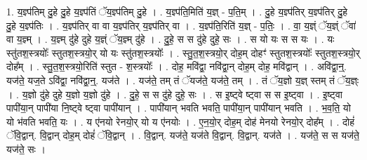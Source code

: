 \documentclass[17pt]{extarticle}
\begin{document}
1. य॒ज्ञ्प॑तिम् दु॒हे दु॒हे य॒ज्ञ्प॑तिं ॅय॒ज्ञ्प॑तिम् दु॒हे । . य॒ज्ञ्प॑ति॒मिति॑ य॒ज्ञ् - प॒ति॒म् । . दु॒हे य॒ज्ञ्प॑तिर् य॒ज्ञ्प॑तिर् दु॒हे दु॒हे य॒ज्ञ्प॑तिः । . य॒ज्ञ्प॑तिर् वा वा य॒ज्ञ्प॑तिर् य॒ज्ञ्प॑तिर् वा । . य॒ज्ञ्प॑ति॒रिति॑ य॒ज्ञ् - प॒तिः॒ । . वा॒ य॒ज्ञ्ं ॅय॒ज्ञ्ं ॅवा॑ वा य॒ज्ञ्म् । . य॒ज्ञ्म् दु॑हे दुहे य॒ज्ञ्ं ॅय॒ज्ञ्म् दु॑हे । . दु॒हे॒ स स दु॑हे दुहे॒ सः । . स यो यः स स यः । . यः स्तु॑तश॒स्त्रयोः᳚ स्तुतश॒स्त्रयो॒र् यो यः स्तु॑तश॒स्त्रयोः᳚ । . स्तु॒त॒श॒स्त्रयो॒र् दोह॒म् दोहꣳ॑ स्तुतश॒स्त्रयोः᳚ स्तुतश॒स्त्रयो॒र् दोह᳚म् । . स्तु॒त॒श॒स्त्रयो॒रिति॑ स्तुत - श॒स्त्रयोः᳚ । . दोह॒ मवि॑द्वा॒ नवि॑द्वा॒न् दोह॒म् दोह॒ मवि॑द्वान् । . अवि॑द्वा॒न्॒. यज॑ते॒ यज॒ते ऽवि॑द्वा॒ नवि॑द्वा॒न्॒. यज॑ते । . यज॑ते॒ तम् तं ॅयज॑ते॒ यज॑ते॒ तम् । . तं ॅय॒ज्ञो य॒ज्ञ् स्तम् तं ॅय॒ज्ञ्ः । . य॒ज्ञो दु॑हे दुहे य॒ज्ञो य॒ज्ञो दु॑हे । . दु॒हे॒ स स दु॑हे दुहे॒ सः । . स इ॒ष्ट्वे ष्ट्वा स स इ॒ष्ट्वा । . इ॒ष्ट्वा पापी॑या॒न् पापी॑या नि॒ष्ट्वे ष्ट्वा पापी॑यान् । . पापी॑यान् भवति भवति॒ पापी॑या॒न् पापी॑यान् भवति । . भ॒व॒ति॒ यो यो भ॑वति भवति॒ यः । . य ए॑नयो रेनयो॒र् यो य ए॑नयोः । . ए॒न॒यो॒र् दोह॒म् दोह॑ मेनयो रेनयो॒र् दोह᳚म् । . दोहं॑ ॅवि॒द्वान्. वि॒द्वान् दोह॒म् दोहं॑ ॅवि॒द्वान् । . वि॒द्वान्. यज॑ते॒ यज॑ते वि॒द्वान्. वि॒द्वान्. यज॑ते । . यज॑ते॒ स स यज॑ते॒ यज॑ते॒ सः । \newline
\end{document}
